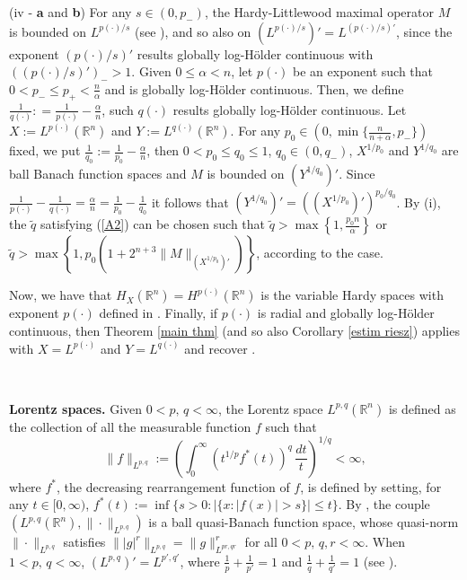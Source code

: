 \documentclass[oneside,10pt]{article}
\begin{document}
(iv - \textbf{a} and \textbf{b}) For any $s \in (0, p_{-})$, the Hardy-Littlewood maximal operator $M$ is bounded on $L^{p(\cdot)/s}$ (see \cite[Theorem 1.5]{DCruz}), and so also on $(L^{p(\cdot)/s})' = L^{(p(\cdot)/s)'}$, since the exponent $(p(\cdot)/s)'$ results globally 
log-H\"older continuous with $((p(\cdot)/s)')_{-} > 1$. Given $0 \leq \alpha < n$, let $p(\cdot)$ be an exponent such that $0 < p_{-} \leq p_{+} < \frac{n}{\alpha}$ and is globally log-H\"older continuous. Then, we define $\frac{1}{q(\cdot)} : = \frac{1}{p(\cdot)} - \frac{\alpha}{n}$, 
such $q(\cdot)$ results globally log-H\"older continuous. Let $X:= L^{p(\cdot)}(\mathbb{R}^n)$ and $Y := L^{q(\cdot)}(\mathbb{R}^n)$. For any 
$p_0 \in (0, \min\{ \frac{n}{n+\alpha}, p_{-} \})$ fixed, we put $\frac{1}{q_0} := \frac{1}{p_0} - \frac{\alpha}{n}$, then 
$0 < p_0 \leq q_0 \leq 1$, $q_0 \in (0, q_{-})$, $X^{1/p_0}$ and $Y^{1/q_0}$ are ball Banach function spaces and $M$ is 
bounded on $(Y^{1/q_0})'$. Since $\frac{1}{p(\cdot)} - \frac{1}{q(\cdot)} = \frac{\alpha}{n} = \frac{1}{p_0} - \frac{1}{q_0}$ it follows that
$(Y^{1/q_0})' = ((X^{1/p_0})')^{p_0/q_0}$. By (i), the $\widetilde{q}$ satisfying (\ref{A2}) can be chosen such that 
$\widetilde{q} > \max \left\{1, \frac{p_0 n}{\alpha} \right\}$ or
$\widetilde{q} > \max \left\{1, p_0 \left(1+2^{n+3} \| M \|_{(X^{1/p_0})'} \right) \right\}$, according to the case.

Now, we have that $H_{X}(\mathbb{R}^n) = H^{p(\cdot)}(\mathbb{R}^n)$ is the variable Hardy spaces with exponent $p(\cdot)$ defined in 
\cite{Nakai}. Finally, if $p(\cdot)$ is radial and globally log-H\"older continuous, then Theorem \ref{main thm} 
(and so also Corollary \ref{estim riesz}) applies with $X= L^{p(\cdot)}$ and $Y = L^{q(\cdot)}$ and recover \cite[Theorem 1.1]{Rocha2018}.

\

{\bf Lorentz spaces.} Given $0 < p, \, q < \infty$, the Lorentz space $L^{p, q}(\mathbb{R}^n)$ is defined as the collection of all the measurable function $f$ such that
\[
\| f \|_{L^{p, q}} := \left( \int_{0}^{\infty} (t^{1/p} f^{\ast}(t))^{q} \, \frac{dt}{t} \right)^{1/q} 
< \infty,
\]
where $f^{\ast}$, the decreasing rearrangement function of $f$, is defined by setting, for any $t \in [0, \infty)$, 
$f^{\ast}(t) := \inf \{ s > 0 : |\{x : |f(x)| > s \}| \leq t \}$.
By \cite[Section 7.3]{sawa}, the couple $\left( L^{p, q}(\mathbb{R}^n), \| \cdot \|_{L^{p, q}} \right)$  is a ball quasi-Banach function space, whose quasi-norm $\| \cdot \|_{L^{p, q}}$ satisfies $\| |g |^r \|_{L^{p, q}} = \| g \|_{L^{pr, qr}}^r$ for all 
$0 < p, \, q, r < \infty$. When $1 < p, \, q < \infty$, $(L^{p, q})' = L^{p', q'}$, where $\frac{1}{p} + \frac{1}{p'} = 1$ and 
$\frac{1}{q} + \frac{1}{q'} = 1$ (see \cite[Theorem 4.7]{Bennett}).
\end{document}
